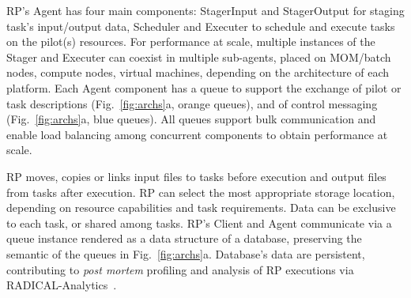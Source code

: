 \documentclass[preprint,12pt, a4paper]{elsarticle}
\begin{document}
RP's Agent has four main components: StagerInput and StagerOutput for staging
task's input/output data, Scheduler and Executer to schedule and execute tasks
on the pilot(s) resources. For performance at scale, multiple instances of the
Stager and Executer can coexist in multiple sub-agents, placed on MOM/batch
nodes, compute nodes, virtual machines, depending on the architecture of each
platform.
%
%
Each Agent component has a queue to support the exchange of pilot or task
descriptions (Fig.~\ref{fig:archs}a, orange queues), and of control messaging
(Fig.~\ref{fig:archs}a, blue queues). All queues support bulk communication and
enable load balancing among concurrent components to obtain performance at
scale.
%

RP moves, copies or links input files to tasks before execution and output files
from tasks after execution. RP can select the most appropriate storage location,
depending on resource capabilities and task requirements. Data can be exclusive
to each task, or shared among tasks.
%
%
RP's Client and Agent communicate via a queue instance rendered as a data
structure of a database, preserving the semantic of the queues in
Fig.~\ref{fig:archs}a. Database's data are persistent, contributing to
\textit{post mortem} profiling and analysis of RP executions via
RADICAL-Analytics~\cite{ra-url}.
\end{document}
